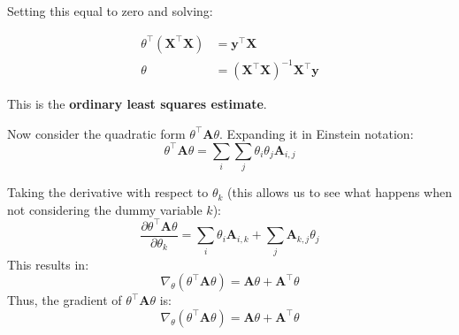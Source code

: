 Setting this equal to zero and solving:

\begin{align*}
    \theta^\top (\bm{X}^\top \bm{X}) & = \bm{y}^\top \bm{X}                           \\
    \theta                           & = (\bm{X}^\top \bm{X})^{-1} \bm{X}^\top \bm{y}
\end{align*}


This is the \textbf{ordinary least squares estimate}.






{
    Now consider the quadratic form \( \theta^\top \mathbf{A} \theta \). Expanding it in Einstein notation:
    \[
        \theta^\top \mathbf{A} \theta = \sum_i \sum_j \theta_i \theta_j \mathbf{A}_{i,j}
    \]

    Taking the derivative with respect to \( \theta_k \) (this allows us to see what happens when not considering the dummy variable \( k \)):
    \[
        \frac{\partial \theta^\top \mathbf{A} \theta}{\partial \theta_k} = \sum_i \theta_i \mathbf{A}_{i,k} + \sum_j \mathbf{A}_{k,j} \theta_j
    \]
    This results in:
    \[
        \nabla_\theta (\theta^\top \mathbf{A} \theta) = \mathbf{A} \theta + \mathbf{A}^\top \theta
    \]
    Thus, the gradient of \( \theta^\top \mathbf{A} \theta \) is:
    \[
        \nabla_\theta (\theta^\top \mathbf{A} \theta) = \mathbf{A} \theta + \mathbf{A}^\top \theta
    \]

}


